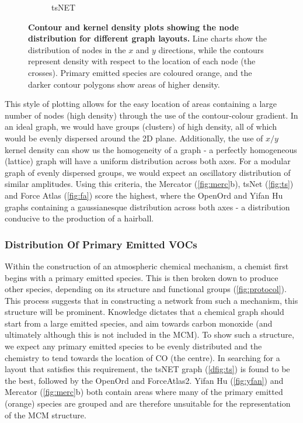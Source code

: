 \begin{figure}[H]
\begin{subfigure}[b]{.49\textwidth}
         \caption{tsNET}
         \label{fig:ts}
     \end{subfigure}
      \hfill
        \caption{ \textbf{Contour and kernel density plots showing the node distribution for different graph layouts.} Line charts show the distribution of nodes in the $x$ and $y$ directions, while the contours represent density with respect to the location of each node (the crosses). Primary emitted species are coloured orange, and the darker contour polygons show areas of higher density.}
        \label{fig:densitycompare}
\end{figure}

This style of plotting allows for the easy location of areas containing a large number of nodes (high density) through the use of the contour-colour gradient. In an ideal graph, we would have groups (clusters) of high density, all of which would be evenly dispersed around the 2D plane.
Additionally, the use of $x/y$ kernel density can show us the homogeneity of a graph - a perfectly homogeneous (lattice) graph will have a uniform distribution across both axes. For a modular graph of evenly dispersed groups, we would expect an oscillatory distribution of similar amplitudes. Using this criteria, the Mercator (\autoref{fig:merc}b), tsNet (\autoref{fig:ts}) and Force Atlas (\autoref{fig:fa}) score the highest, where the OpenOrd and Yifan Hu graphs containing a gaussianesque distribution across both axes - a distribution conducive to the production of a hairball.

\subsubsection{Distribution Of Primary Emitted VOCs}

Within the construction of an atmospheric chemical mechanism, a chemist first begins with a primary emitted species. This is then broken down to produce other species, depending on its structure and functional groups (\autoref{fig:protocol}). This process suggests that in constructing a network from such a mechanism, this structure will be prominent. Knowledge dictates that a chemical graph should start from a large emitted species, and aim towards carbon monoxide (and ultimately  although this is not included in the MCM). To show such a structure, we expect any primary emitted species to be evenly distributed and the chemistry to tend towards the location of CO (the centre). In searching for a layout that satisfies this requirement, the tsNET graph (\autoref{dfig:ts}) is found to be the best, followed by the OpenOrd and ForceAtlas2. Yifan Hu (\autoref{fig:yfan}) and Mercator (\autoref{fig:merc}b) both contain areas where many of the primary emitted (orange) species are grouped and are therefore unsuitable for the representation of the MCM structure.


